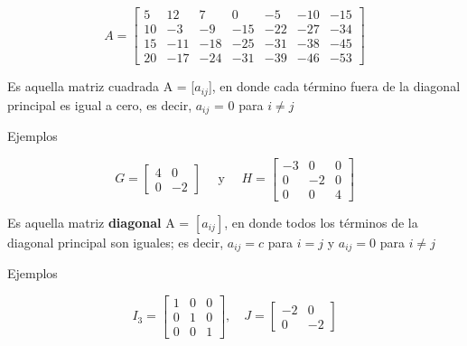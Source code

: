 \documentclass{article}
\begin{document}
$$A=\left[\begin{array}{rrrrrrr}
5 & 12 & 7 & 0 & -5 & -10 & -15 \\
10 & -3 & -9 & -15 & -22 & -27 & -34 \\
15 & -11 & -18 & -25 & -31 & -38 & -45 \\
20 & -17 & -24 & -31 & -39 & -46 & -53
\end{array}\right]$$

\begin{tcolorbox}[colback=blue!10!white,colframe=blue!60!black,title=Matriz Diagonal]
    Es aquella matriz cuadrada A = [$a_{ij}$], en donde cada término fuera de la diagonal principal es igual a cero, es decir, $a_{ij}$ = 0 para $i \neq j$
\end{tcolorbox}

\begin{large}
    Ejemplos
\end{large}

\begin{equation*}
    G=\left[\begin{array}{rr}
    4 & 0 \\
    0 & -2
    \end{array}\right] \quad \text { y } \quad H=\left[\begin{array}{rrr}
    -3 & 0 & 0 \\
    0 & -2 & 0 \\
    0 & 0 & 4
    \end{array}\right]
\end{equation*}

\begin{tcolorbox}[colback=blue!10!white,colframe=blue!60!black,title=Matriz Escalar]
    Es aquella matriz \textbf{diagonal} A = $[a_{ij}]$, en donde todos los términos de la diagonal principal son iguales; es decir, $a_{ij} = c$ para $i = j$ y $a_{ij} = 0$ para $i \neq j$
\end{tcolorbox}

\begin{large}
    Ejemplos
\end{large}

\begin{equation*}
    I_3=\left[\begin{array}{lll}
    1 & 0 & 0 \\
    0 & 1 & 0 \\
    0 & 0 & 1
    \end{array}\right], \quad J=\left[\begin{array}{rr}
    -2 & 0 \\
    0 & -2
    \end{array}\right]
\end{equation*}
\end{document}
